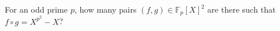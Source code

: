 For an odd prime $p$, how many pairs $\left(f,g\right)\in\mathbb{F}_p\left[X\right]^2$ are there such that $f\circ g=X^{p^2}-X$?